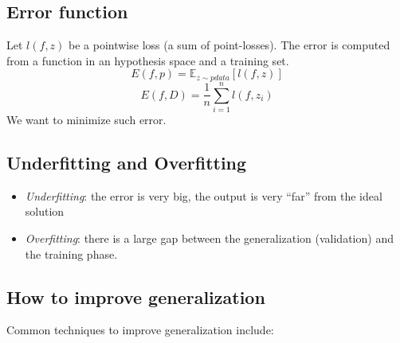 \documentclass[11pt]{article}
\begin{document}
\subsection{Error function}\label{error-function}

Let \(l(f, z)\) be a pointwise loss (a sum of point-losses). The error
is computed from a function in an hypothesis space and a training set.
\[E(f, p) = \mathbb{E}_{z\sim pdata} [l(f, z)]\]
\[E(f, D) = \frac{1}{n}\sum_{i=1}^{n}l(f, z_i)\] We want to minimize
such error.

\subsection{Underfitting and
Overfitting}\label{underfitting-and-overfitting}

\begin{itemize}
\tightlist
\item
  \emph{Underfitting}: the error is very big, the output is very ``far''
  from the ideal solution
\item
  \emph{Overfitting}: there is a large gap between the generalization
  (validation) and the training phase.
\end{itemize}

\subsection{How to improve
generalization}\label{how-to-improve-generalization}

Common techniques to improve generalization include:
\end{document}
